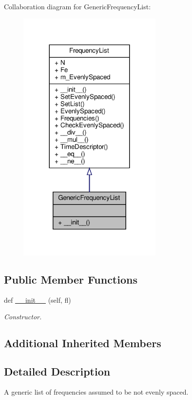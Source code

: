 Collaboration diagram for Generic\+Frequency\+List\+:
\nopagebreak
\begin{figure}[H]
\begin{center}
\leavevmode
\includegraphics[width=203pt]{classSignalIntegrity_1_1FrequencyDomain_1_1FrequencyList_1_1GenericFrequencyList__coll__graph}
\end{center}
\end{figure}
\subsection*{Public Member Functions}
\begin{DoxyCompactItemize}
\item 
def \hyperlink{classSignalIntegrity_1_1FrequencyDomain_1_1FrequencyList_1_1GenericFrequencyList_a9a74e46546d1e8002152b5d0e79786c4}{\+\_\+\+\_\+init\+\_\+\+\_\+} (self, fl)
\begin{DoxyCompactList}\small\item\em Constructor. \end{DoxyCompactList}\end{DoxyCompactItemize}
\subsection*{Additional Inherited Members}


\subsection{Detailed Description}
A generic list of frequencies assumed to be not evenly spaced. 



